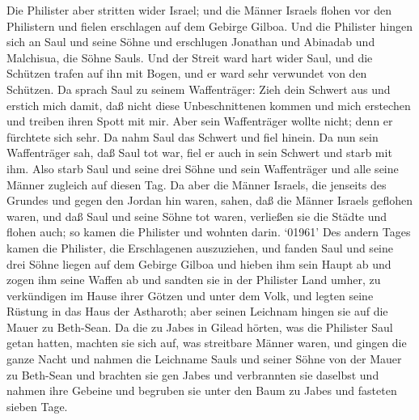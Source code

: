  Die Philister aber stritten wider Israel; und die Männer
Israels flohen vor den Philistern und fielen erschlagen auf dem Gebirge
Gilboa.  Und die Philister hingen sich an Saul und seine
Söhne und erschlugen Jonathan und Abinadab und Malchisua, die Söhne
Sauls.  Und der Streit ward hart wider Saul, und die
Schützen trafen auf ihn mit Bogen, und er ward sehr verwundet von den
Schützen.  Da sprach Saul zu seinem Waffenträger: Zieh dein
Schwert aus und erstich mich damit, daß nicht diese Unbeschnittenen
kommen und mich erstechen und treiben ihren Spott mit mir. Aber sein
Waffenträger wollte nicht; denn er fürchtete sich sehr. Da nahm Saul das
Schwert und fiel hinein.  Da nun sein Waffenträger sah, daß
Saul tot war, fiel er auch in sein Schwert und starb mit ihm.
 Also starb Saul und seine drei Söhne und sein Waffenträger
und alle seine Männer zugleich auf diesen Tag.  Da aber die
Männer Israels, die jenseits des Grundes und gegen den Jordan hin waren,
sahen, daß die Männer Israels geflohen waren, und daß Saul und seine
Söhne tot waren, verließen sie die Städte und flohen auch; so kamen die
Philister und wohnten darin.  `01961' Des andern Tages kamen
die Philister, die Erschlagenen auszuziehen, und fanden Saul und seine
drei Söhne liegen auf dem Gebirge Gilboa  und hieben ihm
sein Haupt ab und zogen ihm seine Waffen ab und sandten sie in der
Philister Land umher, zu verkündigen im Hause ihrer Götzen und unter dem
Volk,  und legten seine Rüstung in das Haus der Astharoth;
aber seinen Leichnam hingen sie auf die Mauer zu Beth-Sean.
 Da die zu Jabes in Gilead hörten, was die Philister Saul
getan hatten,  machten sie sich auf, was streitbare Männer
waren, und gingen die ganze Nacht und nahmen die Leichname Sauls und
seiner Söhne von der Mauer zu Beth-Sean und brachten sie gen Jabes und
verbrannten sie daselbst  und nahmen ihre Gebeine und
begruben sie unter den Baum zu Jabes und fasteten sieben Tage.
